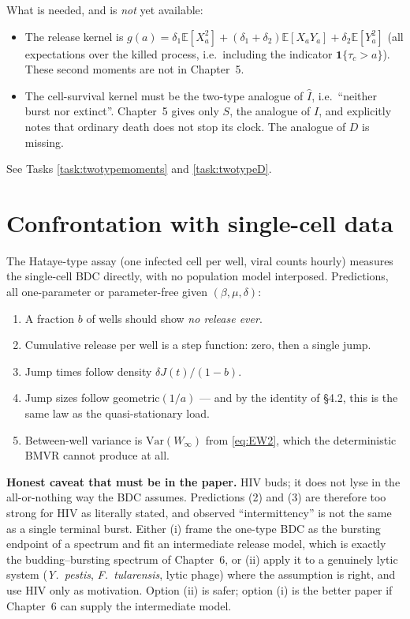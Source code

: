 \documentclass[11pt]{article}
\newcommand{\E}{\mathbb{E}}
\newcommand{\Ihat}{\widehat{I}}
\theoremstyle{plain}
\theoremstyle{definition}
\theoremstyle{remark}
\begin{document}
What is needed, and is \emph{not} yet available:
\begin{itemize}[leftmargin=1.6em,itemsep=0.2em]
\item The release kernel is
$g(a)=\delta_1\E[X_a^2]+(\delta_1+\delta_2)\E[X_aY_a]+\delta_2\E[Y_a^2]$
(all expectations over the killed process, i.e.\ including the indicator
$\mathbf 1\{\tau_c>a\}$). These second moments are not in Chapter~5.
\item The cell-survival kernel must be the two-type analogue of $\Ihat$, i.e.\ ``neither
burst nor extinct''. Chapter~5 gives only $S$, the analogue of $I$, and explicitly notes
that ordinary death does not stop its clock. The analogue of $D$ is missing.
\end{itemize}
See Tasks \ref{task:twotypemoments} and \ref{task:twotypeD}.

\section{Confrontation with single-cell data}

The Hataye-type assay (one infected cell per well, viral counts hourly) measures the
single-cell BDC directly, with no population model interposed. Predictions, all
one-parameter or parameter-free given $(\beta,\mu,\delta)$:

\begin{enumerate}[leftmargin=1.6em,itemsep=0.2em]
\item A fraction $b$ of wells should show \emph{no release ever}.
\item Cumulative release per well is a step function: zero, then a single jump.
\item Jump times follow density $\delta J(t)/(1-b)$.
\item Jump sizes follow geometric$(1/a)$ --- and by the identity of \S4.2, this is the
same law as the quasi-stationary load.
\item Between-well variance is $\mathrm{Var}(W_\infty)$ from \eqref{eq:EW2}, which the
deterministic BMVR cannot produce at all.
\end{enumerate}

\begin{framed}
\textbf{Honest caveat that must be in the paper.} HIV buds; it does not lyse in the
all-or-nothing way the BDC assumes. Predictions (2) and (3) are therefore too strong for
HIV as literally stated, and observed ``intermittency'' is not the same as a single
terminal burst. Either (i) frame the one-type BDC as the bursting endpoint of a spectrum
and fit an intermediate release model, which is exactly the budding--bursting spectrum of
Chapter~6, or (ii) apply it to a genuinely lytic system (\textit{Y.~pestis},
\textit{F.~tularensis}, lytic phage) where the assumption is right, and use HIV only as
motivation. Option (ii) is safer; option (i) is the better paper if Chapter~6 can supply
the intermediate model.
\end{framed}
\end{document}
